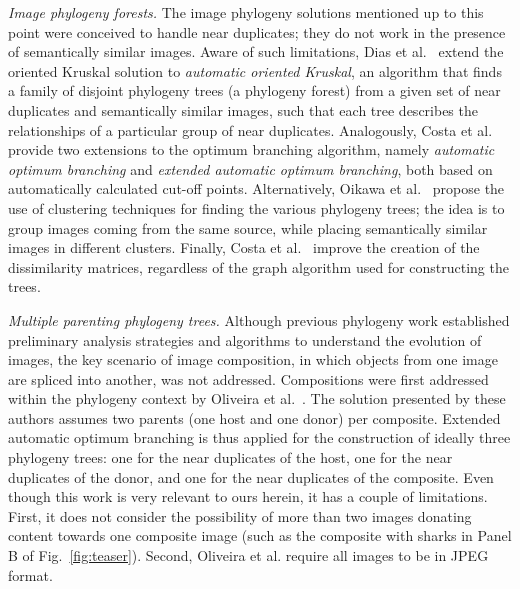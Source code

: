 \textit{Image phylogeny forests.}
The image phylogeny solutions mentioned up to this point were conceived to handle near duplicates; they do not work in the presence of semantically similar images.
Aware of such limitations, Dias et al.~\cite{Dias_2013_fsi} extend the oriented Kruskal solution to \emph{automatic oriented Kruskal}, an algorithm that finds a family of disjoint phylogeny trees (a phylogeny forest) from a given set of near duplicates and semantically similar images, such that each tree describes the relationships of a particular group of near duplicates.
Analogously, Costa et al.~\cite{Costa_2014} provide two extensions to the optimum branching algorithm, namely \emph{automatic optimum branching} and \emph{extended automatic optimum branching}, both based on automatically calculated cut-off points.
Alternatively, Oikawa et al.~\cite{oikawa_2016} propose the use of clustering techniques for finding the various phylogeny trees; the idea is to group images coming from the same source, while placing semantically similar images in different clusters.
Finally, Costa et al.~\cite{Costa_2017} improve the creation of the dissimilarity matrices, regardless of the graph algorithm used for constructing the trees.

\textit{Multiple parenting phylogeny trees.}
Although previous phylogeny work established preliminary analysis strategies and algorithms to understand the evolution of images, the key scenario of image composition, in which objects from one image are spliced into another, was not addressed.
Compositions were first addressed within the phylogeny context by Oliveira et al.~\cite{Oliveira_2016}.
The solution presented by these authors assumes two parents (one host and one donor) per composite.
Extended automatic optimum branching is thus applied for the construction of ideally three phylogeny trees: one for the near duplicates of the host, one for the near duplicates of the donor, and one for the near duplicates of the composite.
Even though this work is very relevant to ours herein, it has a couple of limitations.
First, it does not consider the possibility of more than two images donating content towards one composite image (such as the composite with sharks in Panel B of Fig.~\ref{fig:teaser}).
Second, Oliveira et al. require all images to be in JPEG format.

